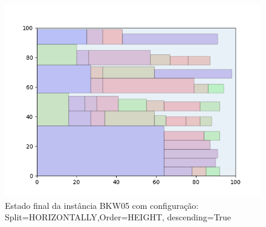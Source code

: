 \begin{figure}[H]
    \centering
    \caption[]{Estado final da instância BKW05 com configuração: Split=HORIZONTALLY,Order=HEIGHT, descending=True}
    \label{fig:bkw05-horizontally-height-true}
    \includegraphics[scale=0.5]{output/figures/bkw/bkw05/horizontally/height/true/00}
\end{figure}
